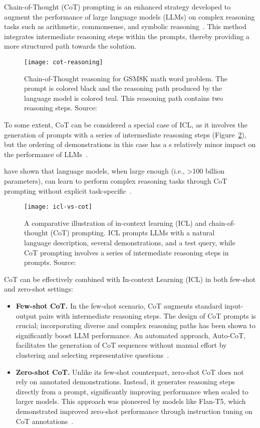 Chain-of-Thought (CoT) prompting is an enhanced strategy developed to augment the performance of large language models (LLMs) on complex reasoning tasks such as arithmetic, commonsense, and symbolic reasoning~\cite{wei2022chain, miao2021diverse, talmor2019commonsenseqa}.
This method integrates intermediate reasoning steps within the prompts, thereby providing a more structured path towards the solution.
\begin{figure}[h!]
	\centering
	\texttt{[image: cot-reasoning]}
	\caption{Chain-of-Thought reasoning for GSM8K math word problem. The prompt is colored black and the reasoning path produced by the language model is colored teal. This reasoning path contains two reasoning steps. Source: \textcite{li2022making}}
	\label{fig:cot-reasoning}
\end{figure}
To some extent, CoT can be considered a special case of ICL, as it involves the generation of prompts with a series of intermediate reasoning steps (Figure~\ref{fig:chain-of-thought}), but the ordering of demonstrations in this case has a s relatively minor impact on the performance of LLMs~\cite{wei2022chain}.

\textcite{wei2022chain, wang2022self} have shown that language models, when large enough (i.e., \textgreater 100 billion parameters), can learn to perform complex reasoning tasks through CoT prompting without explicit task-specific~\cite{wei2022emergent}.

\begin{figure}[h!]
	\centering
	\texttt{[image: icl-vs-cot]}
	\caption{A comparative illustration of in-context learning (ICL) and chain-of-thought (CoT) prompting. ICL prompts LLMs with a natural language description, several demonstrations, and a test query, while CoT prompting involves a series of intermediate reasoning steps in prompts. Source: \textcite{survey}}
	\label{fig:chain-of-thought}
\end{figure}

CoT can be effectively combined with In-context Learning (ICL) in both few-shot and zero-shot settings:
\begin{itemize}
	\item \textbf{Few-shot CoT.} {In the few-shot scenario, CoT augments standard input-output pairs with intermediate reasoning steps.
		      The design of CoT prompts is crucial; incorporating diverse and complex reasoning paths has been shown to significantly boost LLM performance.
		      An automated approach, Auto-CoT, facilitates the generation of CoT sequences without manual effort by clustering and selecting representative questions~\cite{zhang2022automatic}.
	      }
	\item \textbf{Zero-shot CoT.} {Unlike its few-shot counterpart, zero-shot CoT does not rely on annotated demonstrations.
		      Instead, it generates reasoning steps directly from a prompt, significantly improving performance when scaled to larger models.
		      This approach was pioneered by models like Flan-T5, which demonstrated improved zero-shot performance through instruction tuning on CoT annotations~\cite{chung2022scaling}.
	      }
\end{itemize}

